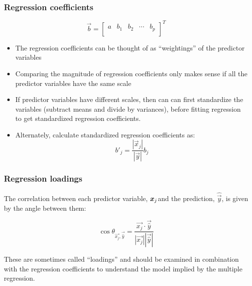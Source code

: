 \documentclass{beamer}
\begin{document}
\begin{frame}
  \frametitle{Regression coefficients}

\[
\vec{b} = 
\left[ 
\begin{array}{ccccc}
a & b_1 & b_2 & \cdots & b_p \\
\end{array}
\right]^T 
\]


\begin{itemize}
    \item The regression coefficients can be thought of as ``weightings'' of the predictor variables
    \item Comparing the magnitude of regression coefficients only makes sense if all the predictor variables have the same scale
    \item If predictor variables have different scales, then can can first standardize the variables (subtract means and divide by variances), before fitting regression to get standardized regression coefficients.  
    \item Alternately, calculate standardized regression coefficients as:
        \[
        b'_j = \frac{|\vec{x}_j|}{|\vec{y}|} b_j
        \]
\end{itemize}

\end{frame}



\begin{frame}
  \frametitle{Regression loadings}

The correlation between each predictor variable, $\bm{x}_j$and the prediction, $\hat{\vec{y}}$, is given by the angle between them:

        \[
        \cos \theta_{\vec{x_j},\vec{\widehat{y}}} = \frac{\vec{x_j} \cdot \vec{\widehat{y}}}{|\vec{x_j}||\vec{\widehat{y}}|}
        \]

\medskip

These are sometimes called ``loadings'' and should be examined in combination with the regression coefficients to understand the model implied by the multiple regression.

\begin{center}
\end{center}


\end{frame}
\end{document}
